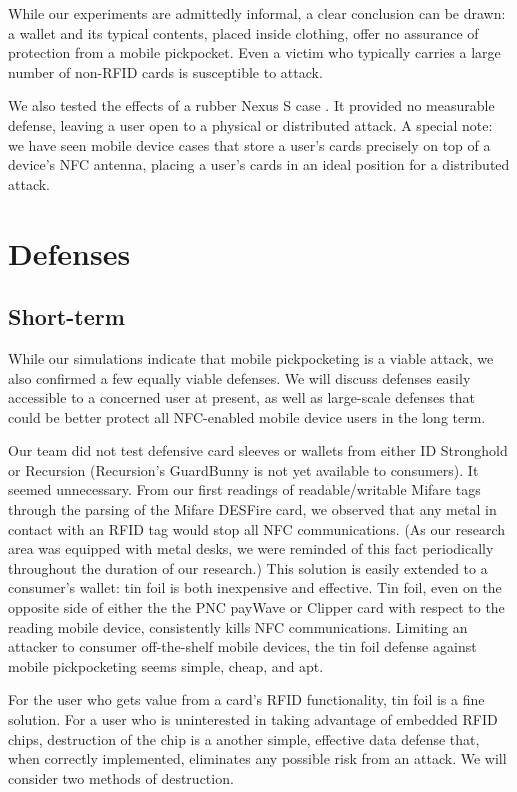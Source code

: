 \documentclass{sig-alternate}
\begin{document}
While our experiments are admittedly informal, a clear conclusion can be drawn:  a wallet and its typical contents, placed inside clothing, offer no assurance of protection from a mobile pickpocket.  Even a victim who typically carries a large number of non-RFID cards is susceptible to attack.

We also tested the effects of a rubber Nexus S case \cite{ebay-epik-nexus-s-case}.  It provided no measurable defense, leaving a user open to a physical or distributed attack.  A special note:  we have seen mobile device cases \cite{ebay-fluffy-nexus-s-case} that store a user's cards precisely on top of a device's NFC antenna, placing a user's cards in an ideal position for a distributed attack.

\section{Defenses}
\subsection{Short-term}
While our simulations indicate that mobile pickpocketing is a viable attack, we also confirmed a few equally viable defenses.  We will discuss defenses easily accessible to a concerned user at present, as well as large-scale defenses that could be better protect all NFC-enabled mobile device users in the long term.

Our team did not test defensive card sleeves or wallets from either ID Stronghold or Recursion (Recursion's GuardBunny is not yet available to consumers).  It seemed unnecessary.  From our first readings of readable/writable Mifare tags through the parsing of the Mifare DESFire card, we observed that any metal in contact with an RFID tag would stop all NFC communications.  (As our research area was equipped with metal desks, we were reminded of this fact periodically throughout the duration of our research.)  This solution is easily extended to a consumer's wallet: tin foil is both inexpensive and effective.  Tin foil, even on the opposite side of either the the PNC payWave or Clipper card with respect to the reading mobile device, consistently kills NFC communications.  Limiting an attacker to consumer off-the-shelf mobile devices, the tin foil defense against mobile pickpocketing seems simple, cheap, and apt.

For the user who gets value from a card's RFID functionality, tin foil is a fine solution.  For a user who is uninterested in taking advantage of embedded RFID chips, destruction of the chip is a another simple, effective data defense that, when correctly implemented, eliminates any possible risk from an attack.  We will consider two methods of destruction.
\end{document}
